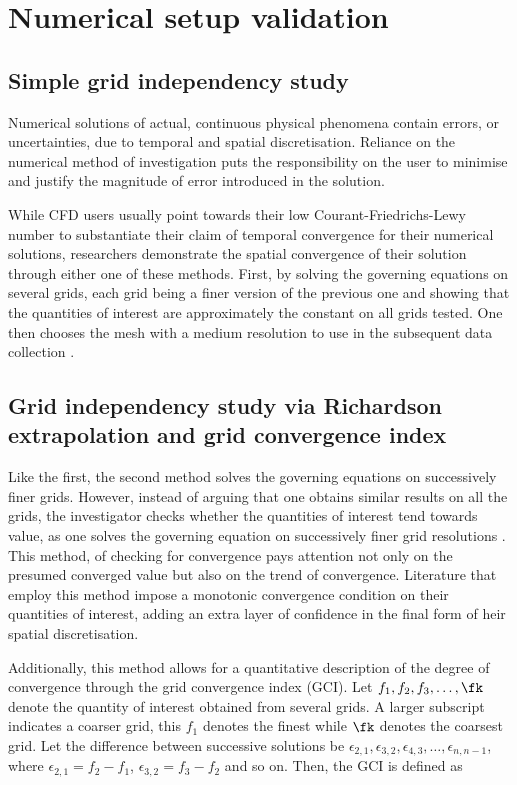 \documentclass[a4paper,fleqn]{cas-sc}
\begin{document}
\section{Numerical setup validation} \label{sec:numSetup}
\subsection{Simple grid independency study} \label{ssec:simpGCI}
Numerical solutions of actual, continuous physical phenomena contain errors, or uncertainties, due to temporal and spatial discretisation. Reliance on the numerical method of investigation puts the responsibility on the user to minimise and justify the magnitude of error introduced in the solution.

While CFD users usually point towards their low Courant-Friedrichs-Lewy number to substantiate their claim of temporal convergence for their numerical solutions, researchers demonstrate the spatial convergence of their solution through either one of these methods. First, by solving the governing equations on several grids, each grid being a finer version of the previous one and showing that the quantities of interest are approximately the constant on all grids tested. One then chooses the mesh with a medium resolution to use in the subsequent data collection \citep{Wu2011,Ding2013,Ding2015a,Ding2019}.

\subsection{Grid independency study via Richardson extrapolation and grid convergence index} \label{ssec:richExtrap}
Like the first, the second method solves the governing equations on successively finer grids. However, instead of arguing that one obtains similar results on all the grids, the investigator checks whether the quantities of interest tend towards value, as one solves the governing equation on successively finer grid resolutions \citep{Richardson1927,Stern2001}. This method, of checking for convergence pays attention not only on the presumed converged value but also on the trend of convergence. Literature that employ this method impose a monotonic convergence condition \citep{Stern2001,MatAli2011,Ali2012,Maruai2018} on their quantities of interest, adding an extra layer of confidence in the final form of heir spatial discretisation.

Additionally, this method allows for a quantitative description of the degree of convergence through the grid convergence index (GCI). Let $f_{1},f_{2},f_{3},\dots,\fk$ denote the quantity of interest obtained from several grids. A larger subscript indicates a coarser grid, this $f_{1}$ denotes the finest while $\fk$ denotes the coarsest grid. Let the difference between successive solutions be $\epsilon_{2,1},\epsilon_{3,2},\epsilon_{4,3},\dots,\epsilon_{n,n-1}$, where $\epsilon_{2,1} = f_{2} - f_{1}$, $\epsilon_{3,2} = f_{3} - f_{2}$ and so on. Then, the GCI is defined as
\end{document}
